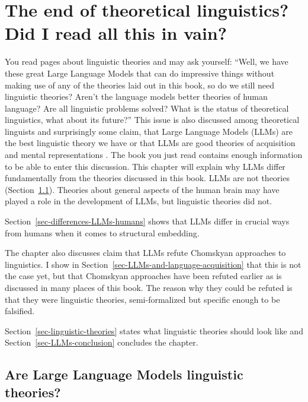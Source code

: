 

\chapter{The end of theoretical linguistics? Did I read all this in vain?}
\label{chapter-LLMs}

You read \pageref{last-page-before-LLMs} pages about linguistic theories and may ask yourself:
``Well, we have these great Large Language Models that can do impressive things without making use
of any of the theories laid out in this book, so do we still need linguistic theories? Aren't the
language models better theories of human language? Are all linguistic problems solved? What is the
status of theoretical linguistics, what about its future?'' This issue is also discussed among
theoretical linguists and surprisingly some claim, that Large Language Models (LLMs) are the best
linguistic theory we have or that LLMs are good theories of
acquisition and mental representations \citep{AmbridgeBlything2024a}. The book you just read contains enough information to be
able to enter this discussion. This chapter will explain why LLMs differ fundamentally from the
theories discussed in this book. LLMs are not theories (Section~\ref{sec-Are-LLMs-linghuistic-theories}). Theories about general aspects of the human
brain may have played a role in the development of LLMs, but linguistic theories did not.

Section~\ref{sec-differences-LLMs-humans} shows that LLMs differ in crucial ways from humans when it
comes to structural embedding.

The chapter also discusses  claim that LLMs refute Chomskyan approaches to linguistics. I show in
Section~\ref{sec-LLMs-and-language-acquisition} that this is not the case yet, but that Chomskyan
approaches have been refuted earlier as is discussed in many places of this book. The reason why
they could be refuted is that they were linguistic theories, semi-formalized but specific enough to
be falsified.

Section~\ref{sec-linguistic-theories} states what linguistic theories should look like and
Section~\ref{sec-LLMs-conclusion} concludes the chapter.


\section{Are Large Language Models linguistic theories?}
\label{sec-Are-LLMs-linghuistic-theories}



